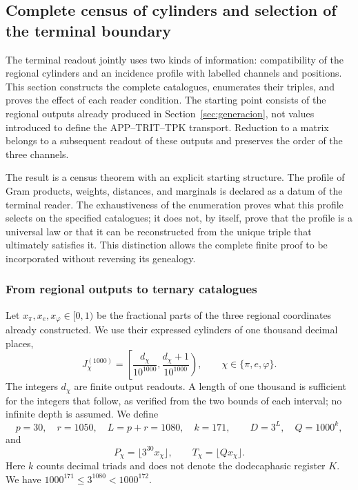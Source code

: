 \subsection{Complete census of cylinders and selection of the terminal boundary}
\label{act21:censo:terminal-completo}

The terminal readout jointly uses two kinds of information: compatibility
of the regional cylinders and an incidence profile with labelled channels and
positions. This section constructs the complete catalogues,
enumerates their triples, and proves the effect of each reader condition.
The starting point consists of the regional outputs already produced in
Section~\ref{sec:generacion}, not values introduced to define
the APP--TRIT--TPK transport. Reduction to a matrix belongs to a subsequent
readout of these outputs and preserves the order of the three channels.

The result is a census theorem with an explicit starting structure.
The profile of Gram products, weights, distances, and marginals is declared as a datum of the
terminal reader. The exhaustiveness of the enumeration proves what
this profile selects on the specified catalogues; it does not, by itself, prove that the
profile is a universal law or that it can be reconstructed from the unique triple
that ultimately satisfies it. This distinction allows the complete finite
proof to be incorporated without reversing its genealogy.

\subsubsection{From regional outputs to ternary catalogues}

Let \(x_\pi,x_e,x_\varphi\in[0,1)\) be the fractional parts of the
three regional coordinates already constructed. We use their expressed
cylinders of one thousand decimal places,
\[
 J_\chi^{(1000)}=
 \left[\frac{d_\chi}{10^{1000}},
       \frac{d_\chi+1}{10^{1000}}\right),
 \qquad \chi\in\{\pi,e,\varphi\}.
\]
The integers \(d_\chi\) are finite output readouts. A length of one thousand
is sufficient for the integers that follow, as verified from the
two bounds of each interval; no infinite depth is assumed.
We define
\begin{equation}
 p=30,\quad r=1050,\quad L=p+r=1080,\quad k=171,
 \qquad D=3^L,\quad Q=1000^k,
 \label{act21:censo:parametros}
\end{equation}
and
\[
 P_\chi=\lfloor3^{30}x_\chi\rfloor,\qquad
 T_\chi=\lfloor Qx_\chi\rfloor.
\]
Here \(k\) counts decimal triads and does not denote the dodecaphasic register
\(K\). We have \(1000^{171}\leq3^{1080}<1000^{172}\).

